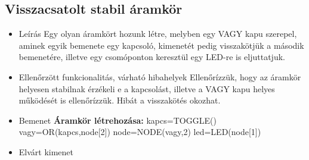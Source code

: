 \subsection{Visszacsatolt stabil áramkör}
\begin{itemize}
\item Leírás\newline
Egy olyan áramkört hozunk létre, melyben egy VAGY kapu szerepel, aminek egyik bemenete egy kapcsoló, kimenetét pedig visszakötjük a második bemenetére, illetve egy csomóponton keresztül egy LED-re is eljuttatjuk.
\item Ellenőrzött funkcionalitás, várható hibahelyek\newline
Ellenőrízzük, hogy az áramkör helyesen stabilnak érzékeli e a kapcsolást, illetve a VAGY kapu helyes működését is ellenőrízzük. Hibát a visszakötés okozhat.
\item Bemenet\newline
\newline
{\bf Áramkör létrehozása:}\newline
kapcs=TOGGLE()\newline
vagy=OR(kapcs,node[2])\newline
node=NODE(vagy,2)\newline
led=LED(node[1])\newline
\item Elvárt kimenet\newline
{}
\end{itemize}



